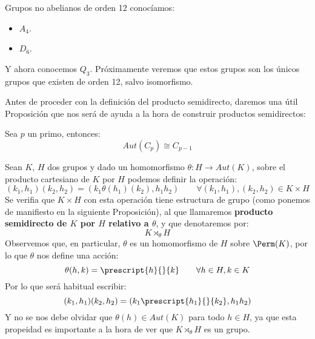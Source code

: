 \begin{ejemplo}
    Grupos no abelianos de orden 12 conocíamos:
    \begin{itemize}
        \item $A_4$.
        \item $D_6$.
    \end{itemize}
    Y ahora conocemos $Q_3$. Próximamente veremos que estos grupos son los únicos grupos que existen de orden 12, salvo isomorfismo.
\end{ejemplo}

\noindent
Antes de proceder con la definición del producto semidirecto, daremos una útil Proposición que nos será de ayuda a la hora de construir productos semidirectos:
\begin{prop}\label{prop:aut_ciclico}
    Sea $p$ un primo, entonces:
    \begin{equation*}
        Aut(C_p) \cong C_{p-1}
    \end{equation*} %
\end{prop}

\begin{definicion}
    Sean $K$, $H$ dos grupos y dado un homomorfismo $\theta:H\to Aut(K)$, sobre el producto cartesiano de $K$ por $H$ podemos definir la operación:
    \begin{equation*}
        (k_1,h_1)(k_2,h_2) = (k_1\theta(h_1)(k_2), h_1h_2) \qquad \forall (k_1,h_1),(k_2,h_2) \in K\times H
    \end{equation*}
    Se verifia que $K\times H$ con esta operación tiene estructura de grupo (como ponemos de manifiesto en la siguiente Proposición), al que llamaremos \textbf{producto semidirecto de $K$ por $H$ relativo a $\theta$}, y que denotaremos por:
    \begin{equation*}
        K\rtimes_\theta H
    \end{equation*}
    Observemos que, en particular, $\theta$ es un homomorfismo de $H$ sobre $\Perm(K)$, por lo que $\theta$ nos define una acción:
    \begin{equation*}
        \theta(h,k) = \prescript{h}{}{k} \qquad \forall h\in H, k\in K
    \end{equation*}
    Por lo que será habitual escribir:
    \begin{equation*}
        (k_1,h_1)(k_2,h_2) = (k_1 \prescript{h_1}{}{k_2}, h_1h_2)
    \end{equation*}
    Y no se nos debe olvidar que $\theta(h) \in Aut(K)$ para todo $h\in H$, ya que esta propeidad es importante a la hora de ver que $K\rtimes_\theta H$ es un grupo.
\end{definicion}

